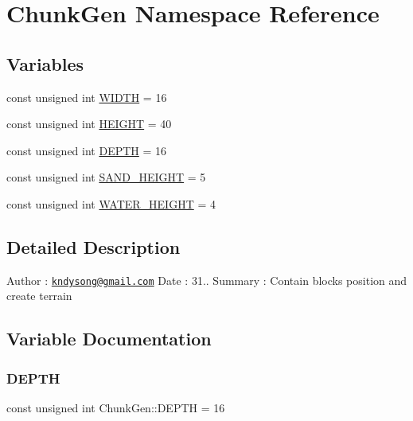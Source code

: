 \hypertarget{namespace_chunk_gen}{}\section{Chunk\+Gen Namespace Reference}
\label{namespace_chunk_gen}
\subsection*{Variables}
\begin{DoxyCompactItemize}
\item 
const unsigned int \mbox{\hyperlink{namespace_chunk_gen_a4ca09e4e3970693f3f516f210f667887}{W\+I\+D\+TH}} = 16
\item 
const unsigned int \mbox{\hyperlink{namespace_chunk_gen_aa95e59ee8c1b6927689c364469c3bb53}{H\+E\+I\+G\+HT}} = 40
\item 
const unsigned int \mbox{\hyperlink{namespace_chunk_gen_a7611db029eacacced8b0289ef3b84ed9}{D\+E\+P\+TH}} = 16
\item 
const unsigned int \mbox{\hyperlink{namespace_chunk_gen_a4261148c21cc9d7b9d751dba21fa7697}{S\+A\+N\+D\+\_\+\+H\+E\+I\+G\+HT}} = 5
\item 
const unsigned int \mbox{\hyperlink{namespace_chunk_gen_a146954a24c7295b674cd167cb194daaa}{W\+A\+T\+E\+R\+\_\+\+H\+E\+I\+G\+HT}} = 4
\end{DoxyCompactItemize}


\subsection{Detailed Description}
Author \+: \href{mailto:kndysong@gmail.com}{\tt kndysong@gmail.\+com} Date \+: 31.. Summary \+: Contain blocks position and create terrain 

\subsection{Variable Documentation}
\mbox{\label{namespace_chunk_gen_a7611db029eacacced8b0289ef3b84ed9}} 
\subsubsection{\texorpdfstring{D\+E\+P\+TH}{DEPTH}}
{\footnotesize\ttfamily const unsigned int Chunk\+Gen\+::\+D\+E\+P\+TH = 16}

